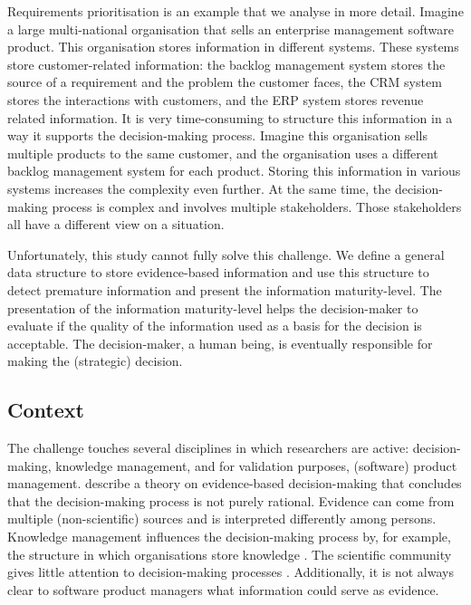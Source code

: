 Requirements prioritisation is an example that we analyse in more detail. Imagine a large multi-national organisation that sells an enterprise management software product. This organisation  stores information in different systems. These systems store customer-related information: the backlog management system stores the source of a requirement and the problem the customer faces, the CRM system stores the interactions with customers, and the ERP system stores revenue related information. It is very time-consuming to structure this information in a way it supports the decision-making process. Imagine this organisation sells multiple products to the same customer, and the organisation uses a different backlog management system for each product. Storing this information in various systems increases the complexity even further. At the same time, the decision-making process is complex and involves multiple stakeholders. Those stakeholders all have a different view on a situation. 

Unfortunately, this study cannot fully solve this challenge. We define a general data structure to store evidence-based information and use this structure to detect premature information and present the information maturity-level. The presentation of the information maturity-level helps the decision-maker to evaluate if the quality of the information used as a basis for the decision is acceptable. The decision-maker, a human being, is eventually responsible for making the (strategic) decision.

\subsection{Context}
The challenge touches several disciplines in which researchers are active: decision-making, knowledge management, and for validation purposes, (software) product management. \cite{DM07} describe a theory on evidence-based decision-making that concludes that the decision-making process is not purely rational. Evidence can come from multiple (non-scientific) sources and is interpreted differently among persons. Knowledge management influences the decision-making process by, for example, the structure in which organisations store knowledge \parencite{KM03}. The scientific community gives little attention to decision-making processes \parencite{PM04}. Additionally, it is not always clear to software product managers what information could serve as evidence.

